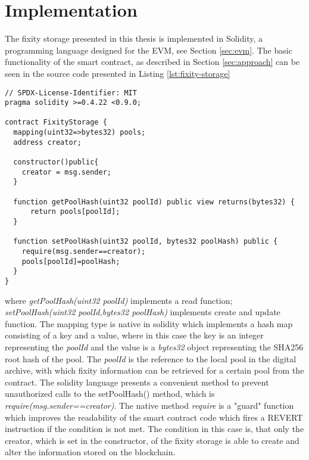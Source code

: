 \section{Implementation}
\label{sec:implementation}
The fixity storage presented in this thesis is implemented in Solidity, a programming language designed for the EVM, see Section \ref{sec:evm}.
The basic functionality of the smart contract, as described in Section \ref{sec:approach} can be seen in the source code presented in Listing \ref{lst:fixity-storage}
\begin{lstlisting}[language=Solidity,caption={MVP source code of the fixity storage deployed on the Ropsten test network \url{https://Ropsten.etherscan.io/address/0x0243c7aa552730E8C6F7ED25A480a7C0c88a70f0}},label=lst:fixity-storage]
// SPDX-License-Identifier: MIT
pragma solidity >=0.4.22 <0.9.0;

contract FixityStorage {
  mapping(uint32=>bytes32) pools;
  address creator;

  constructor()public{
    creator = msg.sender;
  }

  function getPoolHash(uint32 poolId) public view returns(bytes32) {
      return pools[poolId];
  }

  function setPoolHash(uint32 poolId, bytes32 poolHash) public {
    require(msg.sender==creator);
    pools[poolId]=poolHash;
  }
}
\end{lstlisting}
where \textit{getPoolHash(uint32 poolId)} implements a read function; \textit{setPoolHash(uint32 poolId,bytes32 poolHash)} implements create and update function. The mapping type is native in solidity which implements a hash map consisting of a key and a value, where in this case the key is an integer representing the \textit{poolId} and the value is a \textit{bytes32} object representing the SHA256 root hash of the pool. The \textit{poolId} is the reference to the local pool in the digital archive, with which fixity information can be retrieved for a certain pool from the contract. The solidity language presents a convenient  method to prevent unauthorized calls to the setPoolHash() method, which is \textit{require(msg.sender==creator)}. The native method \textit{require} is a "guard" function which improves the readability of the smart contract code which fires a REVERT instruction if the condition is not met. The condition in this case is, that only the creator, which is set in the constructor, of the fixity storage is able to create and alter the information stored on the blockchain.

